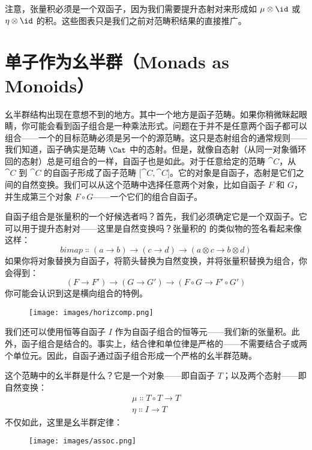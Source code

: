 \noindent
注意，张量积必须是一个双函子，因为我们需要提升态射对来形成如 $\mu \otimes \id$ 或 $\eta \otimes \id$ 的积。这些图表只是我们之前对范畴积结果的直接推广。

\section{单子作为幺半群（Monads as Monoids）}

幺半群结构出现在意想不到的地方。其中一个地方是函子范畴。如果你稍微眯起眼睛，你可能会看到函子组合是一种乘法形式。问题在于并不是任意两个函子都可以组合——一个的目标范畴必须是另一个的源范畴。这只是态射组合的通常规则——我们知道，函子确实是范畴 $\Cat$ 中的态射。但是，就像自态射（从同一对象循环回的态射）总是可组合的一样，自函子也是如此。对于任意给定的范畴 $\cat{C}$，从 $\cat{C}$ 到 $\cat{C}$ 的自函子形成了函子范畴 ${[}\cat{C}, \cat{C}{]}$。它的对象是自函子，态射是它们之间的自然变换。我们可以从这个范畴中选择任意两个对象，比如自函子 $F$ 和 $G$，并生成第三个对象 $F \circ G$——一个它们的组合自函子。

自函子组合是张量积的一个好候选者吗？首先，我们必须确定它是一个双函子。它可以用于提升态射对——这里是自然变换吗？张量积的  的类似物的签名看起来像这样：
\[\mathit{bimap} \Colon (a \to b) \to (c \to d) \to (a \otimes c \to b \otimes d)\]
如果你将对象替换为自函子，将箭头替换为自然变换，并将张量积替换为组合，你会得到：
\[(F \to F') \to (G \to G') \to (F \circ G \to F' \circ G')\]
你可能会认识到这是横向组合的特例。

\begin{figure}[H]
  \centering
  \texttt{[image: images/horizcomp.png]}
\end{figure}

\noindent
我们还可以使用恒等自函子 $I$ 作为自函子组合的恒等元——我们新的张量积。此外，函子组合是结合的。事实上，结合律和单位律是严格的——不需要结合子或两个单位元。因此，自函子通过函子组合形成一个严格的幺半群范畴。

这个范畴中的幺半群是什么？它是一个对象——即自函子 $T$；以及两个态射——即自然变换：
\begin{gather*}
  \mu \Colon T \circ T \to T \\
  \eta \Colon I \to T
\end{gather*}
不仅如此，这里是幺半群定律：

\begin{figure}[H]
  \centering
  \texttt{[image: images/assoc.png]}
\end{figure}

